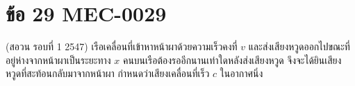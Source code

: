 \section*{ข้อ 29 \hfill \normalsize MEC-0029}
(สอวน รอบที่ 1 2547) เรือเคลื่อนที่เข้าหาหน้าผาด้วยความเร็วคงที่ $v$ และส่งเสียงหวูดออกไปขณะที่อยู่ห่างจากหน้าผาเป็นระยะทาง $x$ คนบนเรือต้องรออีกนานเท่าใดหลังส่งเสียงหวูด จึงจะได้ยินเสียงหวูดที่สะท้อนกลับมาจากหน้าผา กำหนดว่าเสียงเคลื่อนที่เร็ว $c$ ในอากาศนิ่ง
\begin{center}\end{center}
\medskip
